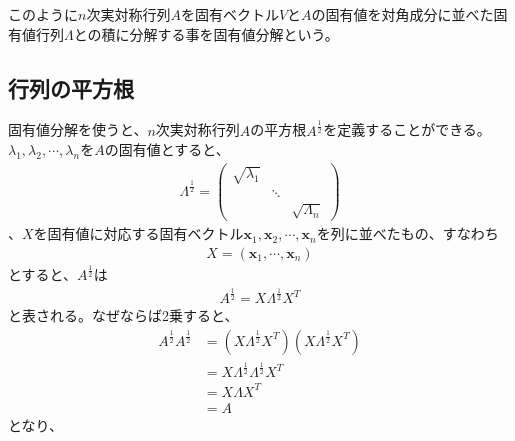 このように$n$次実対称行列$A$を固有ベクトル$V$と$A$の固有値を対角成分に並べた固有値行列$\Lambda$との積に分解する事を固有値分解という。

\subsection{行列の平方根}
固有値分解を使うと、$n$次実対称行列$A$の平方根$\displaystyle{A^{\frac{1}{2}}}$を定義することができる。$\lambda_1, \lambda_2, \cdots, \lambda_n$を$A$の固有値とすると、
\begin{align*}
  \Lambda^{\frac{1}{2}} = \left(
                            \begin{array}{ccc}
                              \sqrt{\lambda_1} &        & \\
                                               & \ddots & \\
                                               &        & \sqrt{\Lambda_n}
                            \end{array}
                          \right)
\end{align*}
、$X$を固有値に対応する固有ベクトル$\mathbf{x}_1, \mathbf{x}_2, \cdots, \mathbf{x}_n$を列に並べたもの、すなわち
\begin{align*}
  X = \left(\mathbf{x}_1, \cdots, \mathbf{x}_n\right)
\end{align*}
とすると、$A^\frac{1}{2}$は
\begin{align*}
  A^\frac{1}{2} = X \Lambda^{\frac{1}{2}} X^T
\end{align*}
と表される。なぜならば2乗すると、
\begin{align*}
  A^{\frac{1}{2}} A^{\frac{1}{2}} & = \left(X \Lambda^{\frac{1}{2}} X^T\right) \left(X \Lambda^{\frac{1}{2}} X^T\right) \\
                                  & = X \Lambda^{\frac{1}{2}} \Lambda^{\frac{1}{2}} X^T \\
                                  & = X \Lambda X^T \\
                                  & = A
\end{align*}
となり、
